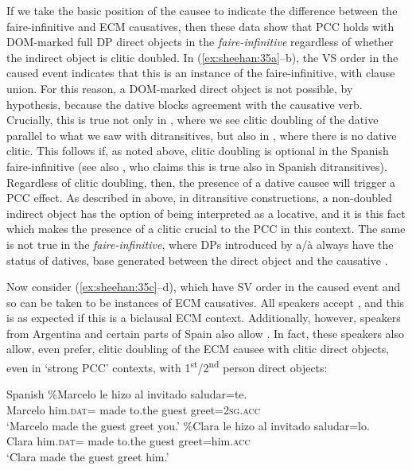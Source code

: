 \documentclass[output=paper,colorlinks,citecolor=brown,nonflat]{langsci/langscibook}
\begin{document}
If we take the basic position of the causee to indicate the difference between the faire-infinitive and ECM causatives, then these data show that PCC holds with DOM-marked full DP direct objects in the \textit{faire-infinitive} regardless of whether the indirect object is clitic doubled. In (\ref{ex:sheehan:35a}--b), the VS order in the caused event indicates that this is an instance of the faire-infinitive, with clause union. For this reason, a DOM-marked direct object is not possible, by hypothesis, because the dative blocks agreement with the causative verb. Crucially, this is true not only in , where we see clitic doubling of the dative parallel to what we saw with ditransitives, but also in , where there is no dative clitic. This follows if, as noted above, clitic doubling is optional in the Spanish faire-infinitive (see also \citealt{Pineda2013}, who claims this is true also in Spanish ditransitives). Regardless of clitic doubling, then, the presence of a dative causee will trigger a PCC effect. As described in  above, in ditransitive constructions, a non-doubled indirect object has the option of being interpreted as a locative, and it is this fact which makes the presence of a clitic crucial to the PCC in this context. The same is not true in the \textit{faire-infinitive}, where DPs introduced by a/à always have the status of datives, base generated between the direct object and the causative \liv .

Now consider (\ref{ex:sheehan:35c}--d), which have SV order in the caused event and so can be taken to be instances of ECM causatives. All speakers accept , and this is as expected if this is a biclausal ECM context. Additionally, however, speakers from Argentina and certain parts of Spain also allow . In fact, these speakers also allow, even prefer, clitic doubling of the ECM causee with clitic direct objects, even in ‘strong PCC’ contexts, with 1\textsuperscript{st}/2\textsuperscript{nd} person direct objects:

\ea%
    \label{ex:sheehan:36}
    Spanish
    \ea\label{ex:sheehan:36a}
    \gll    \%Marcelo   le   hizo   al   invitado saludar=te.\\
            Marcelo   him.\textsc{dat=}   made   to.the   guest  greet=\textsc{2sg}.\textsc{acc}\\
    \glt    ‘Marcelo made the guest greet you.’
    \ex\label{ex:sheehan:36b}
    \gll    \%Clara   le   hizo   al   invitado   saludar=lo.\\
            Clara   him.\textsc{dat=} made   to.the   guest   greet=him.\textsc{acc}\\
    \glt    ‘Clara made the guest greet him.’
    \z
\z
\end{document}
